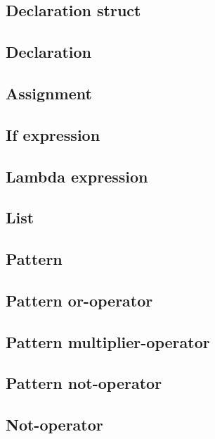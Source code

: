 

\subsection{Declaration struct}



\subsection{Declaration}



\subsection{Assignment}



\subsection{If expression}



\subsection{Lambda expression}



\subsection{List}



\subsection{Pattern}



\subsection{Pattern or-operator}




\subsection{Pattern multiplier-operator}




\subsection{Pattern not-operator}



\subsection{Not-operator}

